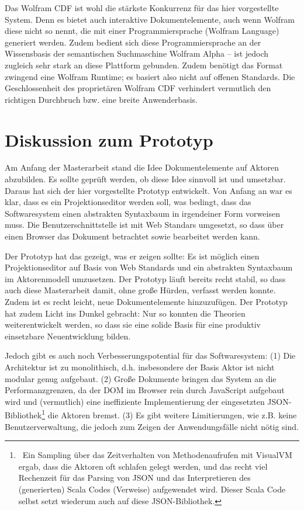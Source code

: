  
Das Wolfram CDF ist wohl die stärkste Konkurrenz für das hier vorgestellte System. Denn es bietet auch interaktive Dokumentelemente, auch wenn Wolfram diese nicht so nennt, die mit einer Programmiersprache (Wolfram Language) generiert werden. Zudem bedient sich diese Programmiersprache an der Wissensbasis der semantischen Suchmaschine Wolfram Alpha -- ist jedoch zugleich sehr stark an diese Plattform gebunden. Zudem benötigt das Format zwingend eine Wolfram Runtime; es basiert also nicht auf offenen Standards. Die Geschlossenheit des proprietären Wolfram CDF verhindert vermutlich den richtigen Durchbruch bzw. eine breite Anwenderbasis.

 
\section{Diskussion zum Prototyp}\label{}
 
Am Anfang der Masterarbeit stand die Idee Dokumentelemente auf Aktoren abzubilden. Es sollte geprüft werden, ob diese Idee sinnvoll ist und umsetzbar. Daraus hat sich der hier vorgestellte Prototyp entwickelt. Von Anfang an war es klar, dass es ein Projektionseditor werden soll, was bedingt, dass das Softwaresystem einen abstrakten Syntaxbaum in irgendeiner Form vorweisen muss. Die Benutzerschnittstelle ist mit Web Standars umgesetzt, so dass über einen Browser das Dokument betrachtet sowie bearbeitet werden kann.

 
Der Prototyp hat das gezeigt, was er zeigen sollte: Es ist möglich einen Projektionseditor auf Basis von Web Standards und ein abstrakten Syntaxbaum im Aktorenmodell umzusetzen. Der Prototyp läuft bereits recht stabil, so dass auch diese Masterarbeit damit, ohne große Hürden, verfasst werden konnte. Zudem ist es recht leicht, neue Dokumentelemente hinzuzufügen. Der Prototyp hat zudem Licht ins Dunkel gebracht: Nur so konnten die Theorien weiterentwickelt werden, so dass sie eine solide Basis für eine produktiv einsetzbare Neuentwicklung bilden.

 
Jedoch gibt es auch noch Verbesserungspotential für das Softwaresystem: (1) Die Architektur ist zu monolithisch, d.h. insbesondere der Basis Aktor ist nicht modular genug aufgebaut. (2) Große Dokumente bringen das System an die Performanzgrenzen, da der DOM im Browser rein durch JavaScript aufgebaut wird und (vermutlich) eine ineffiziente Implementierung der eingesetzten JSON-Bibliothek\footnote{~Ein Sampling über das Zeitverhalten von Methodenaufrufen mit VisualVM ergab, dass die Aktoren oft schlafen gelegt werden, und das recht viel Rechenzeit für das Parsing von JSON und das Interpretieren des (generierten) Scala Codes (Verweise) aufgewendet wird. Dieser Scala Code selbst setzt wiederum auch auf diese JSON-Bibliothek.} die Aktoren bremst. (3) Es gibt weitere Limitierungen, wie z.B. keine Benutzerverwaltung, die jedoch zum Zeigen der Anwendungsfälle nicht nötig sind.

